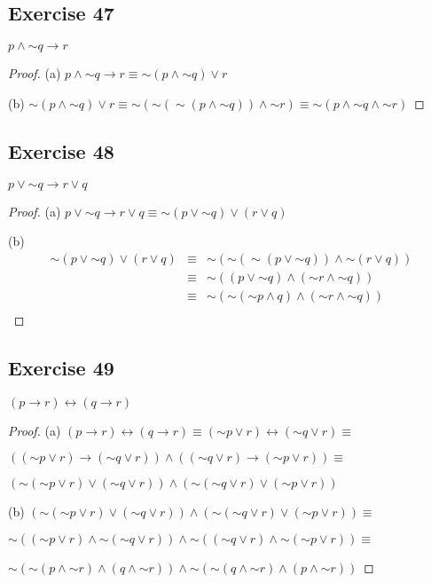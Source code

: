 \documentclass[14pt]{extarticle}
\newcommand{\bic}{\leftrightarrow}
\begin{document}
\subsection{Exercise 47}
$p \wedge {\sim q} \to r$

\begin{proof}
    (a) $p \wedge {\sim q} \to r \equiv {\sim(p \wedge {\sim q})} \vee r$

    (b) ${\sim(p \wedge {\sim q})} \vee r \equiv {\sim ({\sim ({\sim(p \wedge {\sim q})})} \wedge {\sim r})} \equiv {\sim (p \wedge {\sim q} \wedge {\sim r})}$
\end{proof}

\subsection{Exercise 48}
$p \vee {\sim q} \to r \vee q$

\begin{proof}
    (a) $p \vee {\sim q} \to r \vee q \equiv {\sim (p \vee {\sim q})} \vee (r \vee q)$

    (b)
    $$
        \begin{array}{rcl}
            {\sim (p \vee {\sim q})} \vee (r \vee q) & \equiv & {\sim ({\sim ({\sim (p \vee {\sim q})})} \wedge {\sim (r \vee q)})}  \\
                                                     & \equiv & {\sim((p \vee {\sim q}) \wedge ({\sim r} \wedge {\sim q}))}          \\
                                                     & \equiv & {\sim({\sim ({\sim p} \wedge q)} \wedge ({\sim r} \wedge {\sim q}))} \\
        \end{array}
    $$
\end{proof}

\subsection{Exercise 49}
$(p \to r) \bic (q \to r)$

\begin{proof}
    (a) $(p \to r) \bic (q \to r) \equiv ({\sim p} \vee r) \bic ({\sim q} \vee r) \equiv$

    $(({\sim p} \vee r) \to ({\sim q} \vee r)) \wedge (({\sim q} \vee r) \to ({\sim p} \vee r)) \equiv$

    $({\sim ({\sim p} \vee r)} \vee ({\sim q} \vee r)) \wedge ({\sim ({\sim q} \vee r)} \vee ({\sim p} \vee r))$

    (b) $({\sim ({\sim p} \vee r)} \vee ({\sim q} \vee r)) \wedge ({\sim ({\sim q} \vee r)} \vee ({\sim p} \vee r)) \equiv$

    ${\sim (({\sim p} \vee r) \wedge {\sim ({\sim q} \vee r)})} \wedge {\sim (({\sim q} \vee r) \wedge {\sim ({\sim p} \vee r)})} \equiv$

    ${\sim ({\sim (p \wedge {\sim r})} \wedge (q \wedge {\sim r}))} \wedge {\sim ({\sim (q \wedge {\sim r})} \wedge (p \wedge {\sim r}))}$
\end{proof}
\end{document}
